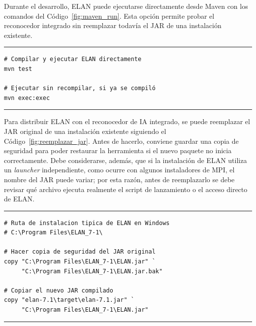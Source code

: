 Durante el desarrollo, ELAN puede ejecutarse directamente desde Maven con los comandos del Código~\ref{fig:maven_run}. Esta opción permite probar el reconocedor integrado sin reemplazar todavía el JAR de una instalación existente.

\begin{center}
\begin{minipage}{0.74\textwidth}
\hrule
\vspace{0.06cm}
\scriptsize
\begin{Verbatim}[baselinestretch=0.72]
# Compilar y ejecutar ELAN directamente
mvn test

# Ejecutar sin recompilar, si ya se compiló
mvn exec:exec
\end{Verbatim}
\vspace{0.03cm}
\hrule

\label{fig:maven_run}
\end{minipage}
\end{center}

Para distribuir ELAN con el reconocedor de IA integrado, se puede reemplazar el JAR original de una instalación existente siguiendo el Código~\ref{fig:reemplazar_jar}. Antes de hacerlo, conviene guardar una copia de seguridad para poder restaurar la herramienta si el nuevo paquete no inicia correctamente. Debe considerarse, además, que si la instalación de ELAN utiliza un \textit{launcher} independiente, como ocurre con algunos instaladores de MPI, el nombre del JAR puede variar; por esta razón, antes de reemplazarlo se debe revisar qué archivo ejecuta realmente el script de lanzamiento o el acceso directo de ELAN.

\begin{center}
\begin{minipage}{0.92\textwidth}
\hrule
\vspace{0.06cm}
\scriptsize
\begin{Verbatim}[baselinestretch=0.72]
# Ruta de instalacion tipica de ELAN en Windows
# C:\Program Files\ELAN_7-1\

# Hacer copia de seguridad del JAR original
copy "C:\Program Files\ELAN_7-1\ELAN.jar" `
     "C:\Program Files\ELAN_7-1\ELAN.jar.bak"

# Copiar el nuevo JAR compilado
copy "elan-7.1\target\elan-7.1.jar" `
     "C:\Program Files\ELAN_7-1\ELAN.jar"
\end{Verbatim}
\vspace{0.03cm}
\hrule

\label{fig:reemplazar_jar}
\end{minipage}
\end{center}

